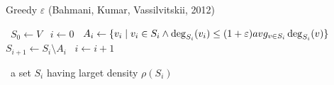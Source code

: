 \begin{algorithm}
    \caption{Greedy $\varepsilon$ (Bahmani, Kumar, Vassilvitskii, 2012)}\label{alg:greedy_epsilon}
    \begin{algorithmic}%
            \State~$S_0 \gets V$
            \State~$i \gets 0$
                    \State~$A_i \gets \{ v_i \; \vert \; v_i \in S_i \wedge \deg_{S_i}(v_i) \leq (1+\varepsilon)avg_{v \in S_i} \deg_{S_i}(v) \}$
                    \State~$S_{i+1} \gets S_i \setminus A_i$
                    \State~$i \gets i+1$
                \EndWhile
                
            \Return~a set $S_i$ having larget density $\rho(S_i)$
        \EndProcedure
    \end{algorithmic}
\end{algorithm}